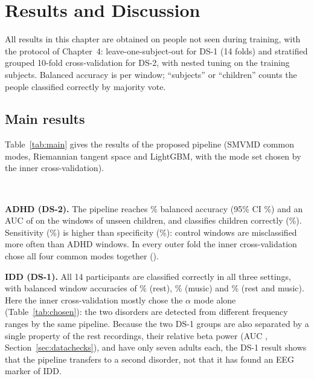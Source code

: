 \chapter{Results and Discussion}
\thispagestyle{empty}

All results in this chapter are obtained on people not seen during training, with the protocol of
Chapter~4: leave-one-subject-out for DS-1 (14 folds) and stratified grouped 10-fold
cross-validation for DS-2, with nested tuning on the training subjects. Balanced accuracy is per
window; ``subjects'' or ``children'' counts the people
classified correctly by majority vote.

\section{Main results}
Table~\ref{tab:main} gives the results of the proposed pipeline (SMVMD common modes, Riemannian
tangent space and LightGBM, with the mode set chosen by the inner cross-validation).

\begin{table}[H]
\caption{The proposed pipeline on unseen people. Window-level balanced accuracy with 95\% CI over
subjects, AUC, sensitivity and specificity (\%), and people classified correctly by majority
vote.}
\label{tab:main}\centering
{}\\[2pt]
{\footnotesize \dstwonote}
\end{table}

\textbf{ADHD (DS-2).} The pipeline reaches \% balanced accuracy (95\% CI
\%) and an AUC of  on the windows of unseen children, and
classifies  children correctly (\%). Sensitivity (\%) is
higher than specificity (\%): control windows are misclassified more often than
ADHD windows. In every outer fold the inner cross-validation chose all four common modes
together ().

\textbf{IDD (DS-1).} All 14 participants are classified correctly in all three settings, with
balanced window accuracies of \% (rest), \% (music) and
\% (rest and music). Here the inner
cross-validation mostly chose the $\alpha$ mode alone (Table~\ref{tab:chosen}): the two
disorders are detected from different frequency ranges by the same pipeline. Because the two DS-1
groups are also separated by a single property of the rest recordings, their relative beta power
(AUC , Section~\ref{sec:datachecks}), and have only seven adults each,
the DS-1 result shows that the pipeline transfers to a second disorder, not that it has found an
EEG marker of IDD.

